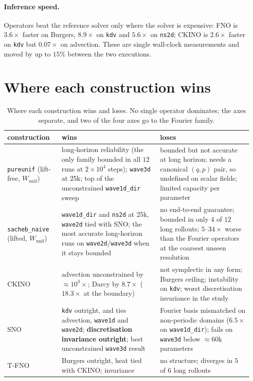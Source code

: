\documentclass[11pt]{article}
\theoremstyle{definition}
\theoremstyle{remark}
\newcommand{\Wu}{W_{\mathrm{unif}}}
\newcommand{\ckino}{\textsc{CKINO}}
\begin{document}
\paragraph{Inference speed.} Operators beat the reference solver only where the
solver is expensive: FNO is $3.6\times$ faster on Burgers, $8.9\times$ on \texttt{kdv}
and $5.6\times$ on \texttt{ns2d}; \ckino{} is $2.6\times$ faster on \texttt{kdv} but
$0.07\times$ on advection. These are single wall-clock measurements and moved by
up to $15\%$ between the two executions.

\section{Where each construction wins}
\label{sec:verdict}

\begin{table}[htbp]
\centering
\caption{Where each construction wins and loses. No single operator dominates;
the axes separate, and two of the four axes go to the Fourier family.}
\label{tab:verdict}
\small
\begin{tabular}{@{}lp{56mm}p{48mm}@{}}
\toprule
construction & wins & loses \\
\midrule
\texttt{pureunif} (lift-free, $\Wu$)
 & long-horizon reliability (the only family bounded in all $12$ runs at $2\times10^{4}$ steps); \texttt{wave3d} at 25k; top of the unconstrained \texttt{wave1d\_dir} sweep
 & bounded but not accurate at long horizon; needs a canonical $(q,p)$ pair, so undefined on scalar fields; limited capacity per parameter \\
\addlinespace
\texttt{sacheb\_naive} (lifted, $\Wu$)
 & \texttt{wave1d\_dir} and \texttt{ns2d} at 25k, \texttt{wave2d} tied with SNO; the most accurate long-horizon runs on \texttt{wave2d}/\texttt{wave3d} when it stays bounded
 & no end-to-end guarantee; bounded in only $4$ of $12$ long rollouts; $5$--$34\times$ worse than the Fourier operators at the coarsest unseen resolution \\
\addlinespace
\ckino{}
 & advection unconstrained by $\approx10^{3}\times$; Darcy by $8.7\times$ ($18.3\times$ at the boundary)
 & not symplectic in any form; Burgers ceiling; instability on \texttt{kdv}; worst discretisation invariance in the study \\
\addlinespace
SNO \citep{makara2026sno}
 & \texttt{kdv} outright, and ties advection, \texttt{wave1d} and \texttt{wave2d}; \textbf{discretisation invariance outright}; best unconstrained \texttt{wave3d} result
 & Fourier basis mismatched on non-periodic domains ($6.5\times$ on \texttt{wave1d\_dir}); fails on \texttt{wave3d} below $\approx60$k parameters \\
\addlinespace
T-FNO \citep{kossaifi2023mgtfno}
 & Burgers outright, heat tied with \ckino{}; invariance
 & no structure; diverges in $5$ of $6$ long rollouts \\
\bottomrule
\end{tabular}
\end{table}
\end{document}
